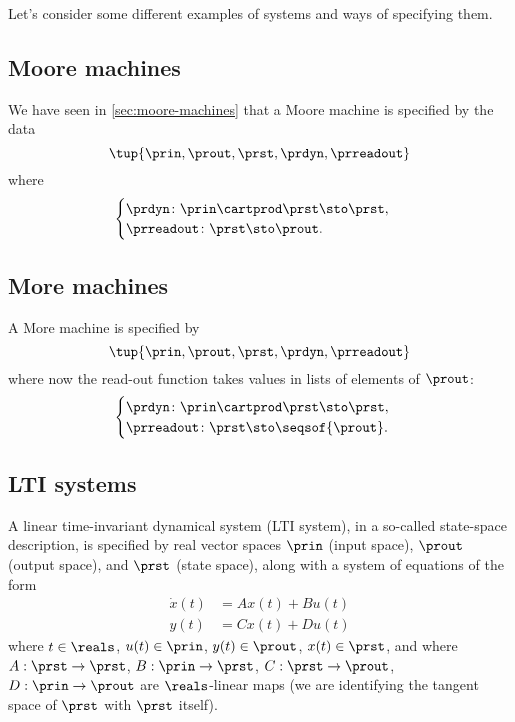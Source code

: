 Let's consider some different examples of systems and ways of specifying them.

\subsection{Moore machines}

We have seen in \cref{sec:moore-machines}  that a Moore machine is specified by the data
\begin{equation}
\tup{\prin, \prout, \prst, \prdyn, \prreadout}
\end{equation}
where 
\begin{equation}\label{eq:moore-specification-again}
    \begin{cases}
        \prdyn \colon \prin \cartprod \prst \sto \prst, \\
        \prreadout \colon \prst \sto \prout.
    \end{cases}
\end{equation}

\subsection{More machines}

A More machine is specified by
\begin{equation}
\tup{\prin, \prout, \prst, \prdyn, \prreadout}
\end{equation}
where now the read-out function takes values in lists of elements of $\prout$: 
\begin{equation}\label{eq:moore-specification-again}
    \begin{cases}
        \prdyn \colon \prin \cartprod \prst \sto \prst, \\
        \prreadout \colon \prst \sto \seqsof{\prout}.
    \end{cases}
\end{equation}

\subsection{LTI systems}

A linear time-invariant dynamical system (LTI system), in a so-called state-space description, is specified by real vector spaces $\prin$ (input space), $\prout$ (output space), and $\prst$ (state space), along with a system of equations of the form
\begin{align}
        \dot x(t) &= Ax(t) + Bu(t) \label{eq:LTI-system-dyn} \\
        y(t) &= Cx(t) + Du(t) \label{eq:LTI-system-ro}
\end{align}
where $t \in \reals$, $u(t) \in \prin$, $y(t) \in \prout$, $x(t) \in \prst$, and where $A: \prst \to \prst$, $B: \prin \to \prst$, $C: \prst \to \prout$, $D: \prin \to \prout$ are $\reals$-linear maps (we are identifying the tangent space of $\prst$ with $\prst$ itself). 

